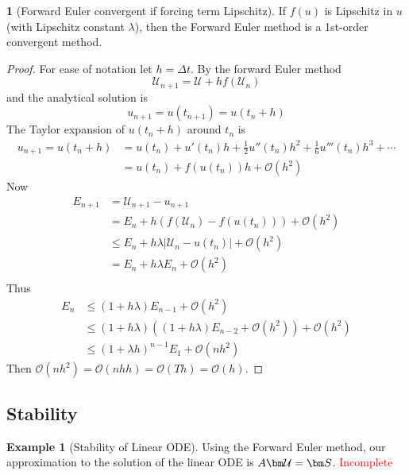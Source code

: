 \documentclass[12pt]{article}
\theoremstyle{definition}
\newtheorem{theorem}{\color{ForestGreen}{\textbf{Theorem}}}
\newcommand{\U}{\mathcal{U}}
\newtheorem{example}{\color{WildStrawberry}Example}
\theoremstyle{definition}
\begin{document}
\begin{theorem}[Forward Euler convergent if forcing term Lipschitz]
	If $f(u)$ is Lipschitz in $u$ (with Lipschitz constant $\lambda$), then the Forward Euler method is a 1st-order convergent method.
\end{theorem}
\begin{proof}
	For ease of notation let $h = \Delta t$. By the forward Euler method
	\begin{equation}
		\U_{n+1} = \U + hf(\U_n)
	\end{equation}
	and the analytical solution is
	\begin{equation}
		u_{n+1} = u(t_{n+1}) = u(t_n + h)
	\end{equation}
	The Taylor expansion of $u(t_n + h)$ around $t_n$ is
	\begin{align*}
		u_{n+1} = u(t_n + h) &= u(t_n) + u'(t_n)h + \frac{1}{2}u''(t_n)h^2 + \frac{1}{6}u'''(t_n)h^3 + \cdots \\
		&= u(t_n) + f(u(t_n)) h + \mathcal{O}(h^2) \tag{since $u'(t_n) = f(u(t_n))$}
	\end{align*}
	Now
	\begin{align*}
		E_{n+1} &= \U_{n+1} - u_{n+1} \\
		&= E_n +h (f(\U_n) - f(u(t_n))) + \mathcal{O}(h^2) \\
		&\leq E_n + h\lambda |\U_n - u(t_n)| + \mathcal{O}(h^2) \tag{$f$ Lipshitz}\\ 
		&= E_n + h \lambda E_n + \mathcal{O}(h^2) \\
	\end{align*}
	Thus
	\begin{align*}
		E_{n} &\leq (1 + h \lambda)E_{n-1} + \mathcal{O}(h^2) \\
		&\leq (1 + h \lambda)((1 + h \lambda)E_{n-2} + \mathcal{O}(h^2)) + \mathcal{O}(h^2) \\
		&\leq (1 + \lambda h)^{n-1} E_{1} + \mathcal{O}(n h^2)  
	\end{align*}
	Then $\mathcal{O}(n h^2) = \mathcal{O}(n h h)  = \mathcal{O}(Th) = \mathcal{O}(h)$.
\end{proof}

\subsection{Stability}

\begin{example}[Stability of Linear ODE]
	Using the Forward Euler method, our approximation to the solution of the linear ODE is $A \bm \U = \bm S$.
	\textcolor{red}{Incomplete}
\end{example}
\end{document}
